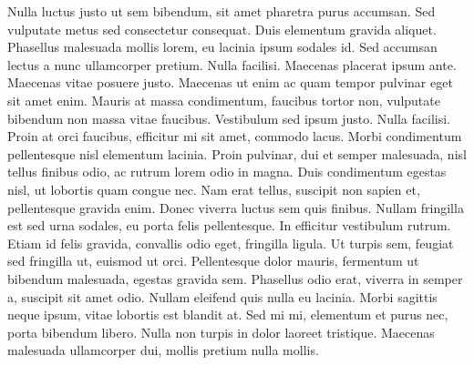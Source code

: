 Nulla luctus justo ut sem bibendum, sit amet pharetra purus accumsan. Sed
vulputate metus sed consectetur consequat. Duis elementum gravida aliquet.
Phasellus malesuada mollis lorem, eu lacinia ipsum sodales id. Sed accumsan
lectus a nunc ullamcorper pretium. Nulla facilisi. Maecenas placerat ipsum
ante. Maecenas vitae posuere justo. Maecenas ut enim ac quam tempor pulvinar
eget sit amet enim. Mauris at massa condimentum, faucibus tortor non, vulputate
bibendum non massa vitae faucibus. Vestibulum sed ipsum justo. Nulla facilisi.
Proin at orci faucibus, efficitur mi sit amet, commodo lacus. Morbi condimentum
pellentesque nisl elementum lacinia. Proin pulvinar, dui et semper malesuada,
nisl tellus finibus odio, ac rutrum lorem odio in magna. Duis condimentum
egestas nisl, ut lobortis quam congue nec. Nam erat tellus, suscipit non sapien
et, pellentesque gravida enim. Donec viverra luctus sem quis finibus. Nullam
fringilla est sed urna sodales, eu porta felis pellentesque. In efficitur
vestibulum rutrum. Etiam id felis gravida, convallis odio eget, fringilla
ligula. Ut turpis sem, feugiat sed fringilla ut, euismod ut orci. Pellentesque
dolor mauris, fermentum ut bibendum malesuada, egestas gravida sem.
Phasellus odio erat, viverra in semper a, suscipit sit amet odio. Nullam
eleifend quis nulla eu lacinia. Morbi sagittis neque ipsum, vitae lobortis est
blandit at. Sed mi mi, elementum et purus nec, porta bibendum libero. Nulla non
turpis in dolor laoreet tristique. Maecenas malesuada ullamcorper dui, mollis
pretium nulla mollis. 
